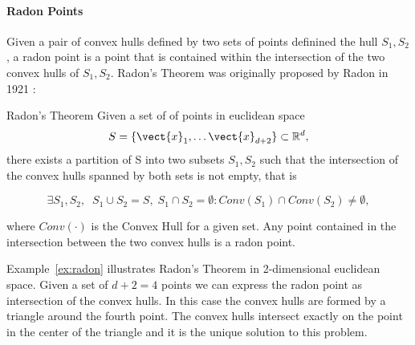 \paragraph*{Radon Points}
Given a pair of convex hulls defined by two sets of points definined the hull $S_1, S_2$, a radon point is a point that is contained within the intersection of the two convex hulls of $S_1, S_2$. 
Radon's Theorem was originally proposed by Radon in 1921 \cite{radon1921mengen}:

\begin{threm}[label=thm:radon]{Radon's Theorem}
    Given a set of of points in euclidean space
    \begin{equation}
        S = \{\vect{x}_1, \ldots \vect{x}_{d+2}\} \subset \mathbb{R}^d,
    \end{equation}
   there exists a partition of S into two subsets $S_1, S_2$ such that the intersection of the convex hulls spanned by both sets is not empty, that is
    
    \begin{equation}
        \exists S_1, S_2, \;\; S_1 \cup S_2 = S, \; S_1 \cap S_2 = \emptyset: Conv(S_1) \cap Conv(S_2) \neq \emptyset,
    \end{equation}

    where $Conv(\cdot)$ is the Convex Hull for a given set.
    Any point contained  in the intersection between the two convex hulls is a radon point.
\end{threm}

Example~\ref{ex:radon} illustrates Radon's Theorem in 2-dimensional euclidean space.
Given a set of $d+2 =4$ points we can express the radon point as intersection of the convex hulls.
In this case the convex hulls are formed by a triangle around the fourth point.
The convex hulls intersect exactly on the point in the center of the triangle and it is the unique solution to this problem.

